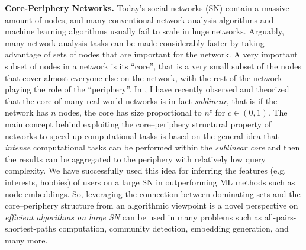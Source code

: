 \documentclass[11pt]{article}
\begin{document}
\noindent \textbf{Core-Periphery Networks.} Today's social networks (SN) contain a massive amount of nodes, and many conventional network analysis algorithms and machine learning algorithms usually fail to scale in huge networks. Arguably, many network analysis tasks can be made considerably faster by taking advantage of sets of nodes that are important for the network. A very important subset of nodes in a network is its ``core'', that is a very small  subset of the nodes that cover almost everyone else on the network, with the rest of the network playing the role of the ``periphery''. In \cite{papachristou2021sublinear}, I have recently observed and theorized that the core of many real-world networks is in fact \emph{sublinear}, that is if the network has $n$ nodes, the core has size proportional to $n^c$ for $c \in (0, 1)$. The main concept behind exploiting the core--periphery structural property of networks to speed up computational tasks is based on the general idea that \emph{intense} computational tasks can be performed within the \emph{sublinear core} and then the results can be aggregated to the periphery with relatively low query complexity. We have successfully used this idea for inferring the features (e.g. interests, hobbies) of users on a large SN in \cite{papachristou2021stochastic} outperforming ML methods such as node embeddings.  So, leveraging the connection between dominating sets and the core--periphery structure from an algorithmic viewpoint is   a novel perspective on \emph{efficient algorithms on large SN} can be used in many problems such as all-pairs-shortest-paths computation, community detection, embedding generation, and many more. 




\nocite{*}

{\small


}
\end{document}
